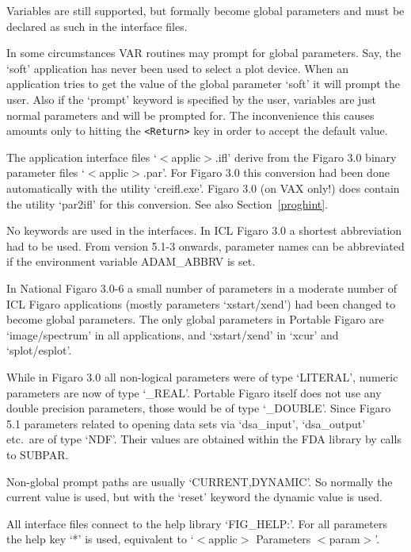 \documentclass[11pt,twoside]{article}
\newcommand{\htmlref}[2]{#1}
\newcommand{\latorhtm}[2]{#1}
\newcommand{\latorhtm}[2]{#2}
\begin{document}
   Variables are still supported, but formally become global parameters
   and must be declared as such in the interface files.

   In some circumstances VAR routines may prompt for global parameters.
   Say, the `soft' application has never been used to select a plot
   device. When an application tries to get the value of the global
   parameter `soft' it will prompt the user. Also if the `prompt'
   keyword is specified by the user, variables are just normal
   parameters and will be prompted for. The inconvenience this causes
   amounts only to hitting the \texttt{<Return>} key in order to accept the
   default value.

   The application interface files `$<$applic$>$.ifl' derive from the Figaro
   3.0 binary parameter files `$<$applic$>$.par'. For Figaro 3.0 this
   conversion had been done automatically with the utility `creifl.exe'.
   Figaro 3.0 (on VAX only!) does contain the utility `par2ifl' for this
   conversion.  See also
   \latorhtm{Section~\ref{proghint}.}
   {the \htmlref{section for programmers.}{proghint}}

   No keywords are used in the interfaces.
   In ICL Figaro 3.0 a shortest abbreviation had to be used. From version
   5.1-3 onwards, parameter names can be abbreviated if the environment
   variable ADAM\_ABBRV is set.

   In National Figaro 3.0-6 a small number of parameters in a moderate
   number of ICL Figaro applications (mostly parameters `xstart/xend')
   had been changed to become global parameters. The only global
   parameters in Portable Figaro are `image/spectrum' in all
   applications, and `xstart/xend' in `xcur' and `splot/esplot'.

   While in Figaro 3.0 all non-logical parameters were of type
   `LITERAL', numeric parameters are now of type `\_REAL'. Portable
   Figaro itself does not use any double precision parameters, those
   would be of type `\_DOUBLE'. Since Figaro 5.1 parameters related to
   opening data sets via `dsa\_input', `dsa\_output' etc.\ are of type
   `NDF'. Their values are obtained within the FDA library by calls to
   SUBPAR.

   Non-global prompt paths are usually `CURRENT,DYNAMIC'. So normally
   the current value is used, but with the `reset' keyword the dynamic
   value is used.

   All interface files connect to the help library `FIG\_HELP:'. For
   all parameters the help key `*' is used, equivalent to `$<$applic$>$
   Parameters $<$param$>$'.
\end{document}
